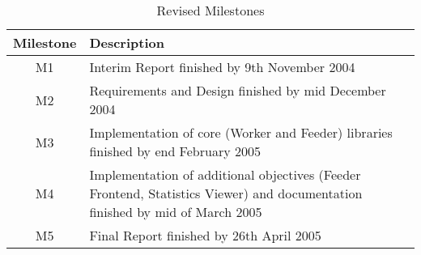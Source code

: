 \begin{table}[H]
\begin{tabularx}{\linewidth}{cX}
\toprule
\textbf{Milestone} & \textbf{Description} \\
\midrule
\endhead
M1 & Interim Report finished by 9th November 2004 \\
M2 & Requirements and Design finished by mid December 2004 \\
M3 & Implementation of core (Worker and Feeder) libraries finished by end February 2005 \\
M4 & Implementation of additional objectives (Feeder Frontend, Statistics Viewer) and documentation finished by mid of March 2005 \\
M5 & Final Report finished by 26th April 2005 \\
\bottomrule
\end{tabularx}
\caption{Revised Milestones}
\label{tab:rev_milestones}
\end{table}
